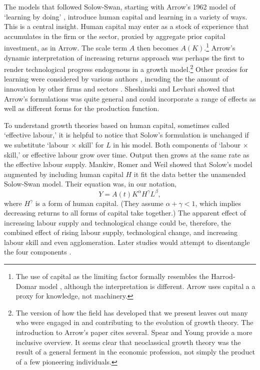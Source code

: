 {The models that followed Solow-Swan, starting with Arrow's 1962 model of `learning by doing' \cite{arrowEconomicImplicationsLearning1962a}, introduce \gls{human capital} and learning in a variety of ways. This is a central insight. Human capital may enter  as a stock of experience that accumulates in the firm or the sector, proxied by aggregate prior capital investment, as  in Arrow. The scale term $A$ then becomes $A(K)$.\footnote{The use of capital as the limiting factor formally resembles the Harrod-Domar model \cite{harrodEssayDynamicTheory1939, domarCapitalExpansionRate1946}, although the interpretation is different. Arrow uses capital a a proxy for knowledge, not machinery.} Arrow's  dynamic interpretation of increasing returns  approach was perhaps the first to  render technological progress endogenous in a growth model.\footnote{The version of how the field has developed that we present leaves out many who were engaged in and contributing to the evolution of growth theory. The introduction to  Arrow's paper cites several. Spear and Young\cite{spearMACROECONOMICDYNAMICSSURVEY2018} provide a more inclusive overview. It seems clear that neoclassical growth theory was the result of a general ferment in the economic profession, not simply the product of a few pioneering individuals.} 
Other proxies for learning were considered by various authors \cite{levhariExtensionsArrowLearning1966, sheshinskiOptimalAccumulationLearning1967}, incuding the the amount of innovation by other firms and sectors  \cite{kingEndogenousGrowthRole1989}. Sheshinski and Levhari showed that Arrow's formulations was quite general and could incorporate a range of effects as well as different forms for the production function.


To understand  growth theories based on \gls{human capital},  sometimes called `\gls{effective labour},' it is helpful to notice that Solow's formulation is unchanged if we substitute `labour $\times$ skill' for $L$ in his model. Both components of `labour $\times$  skill,' or effective labour grow over time. Output then grows at the same rate as the effective labour supply. Mankiw, Romer and Weil \cite{mankiwContributionEmpiricsEconomic1992} showed that  
Solow's model  augmented by including human capital $H$ it fit the data better the unamended Solow-Swan model. Their equation was, in our notation,   
\begin{equation*}
Y=A(t)K^\alpha H^\gamma L^\beta, 
\end{equation*}
where $H^\gamma$ is a form of human capital. (They assume $\alpha+\gamma<1$, which implies decreasing returns to all forms of capital take together.) The apparent effect of increasing labour supply and technological change could be, therefore, the combined effect of rising labour supply, technological change, and increasing labour skill and even agglomeration. Later studies would attempt to disentangle the four components .


}
